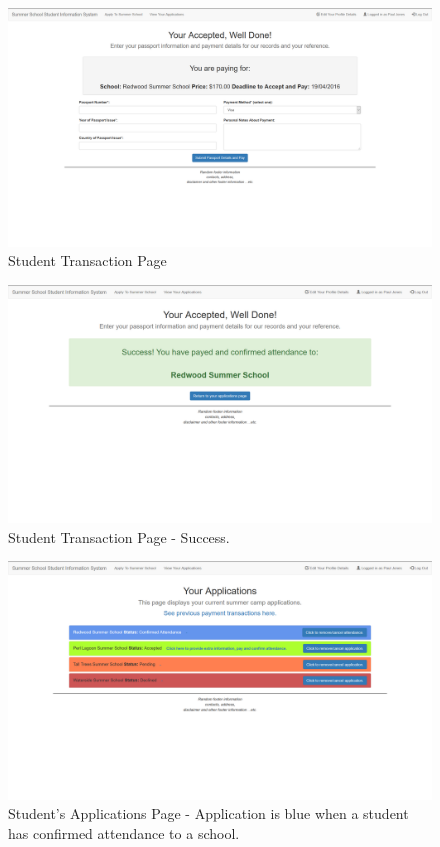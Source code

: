 \documentclass{project}
\begin{document}
\begin{figure}[h]
\includegraphics[width=\linewidth]{transaction.png}
\caption{Student Transaction Page}
\label{fig:student-transaction}
\end{figure}
\begin{figure}[h]
\includegraphics[width=\linewidth]{transaction-success.png}
\caption{Student Transaction Page - Success.}
\label{fig:student-transaction-success}
\end{figure}
\begin{figure}[h]
\includegraphics[width=\linewidth]{student-app-confirmed.png}
\caption{Student's Applications Page - Application is blue when a student has confirmed attendance to a school.}
\label{fig:students-applications-confirmed}
\end{figure}
\end{document}
